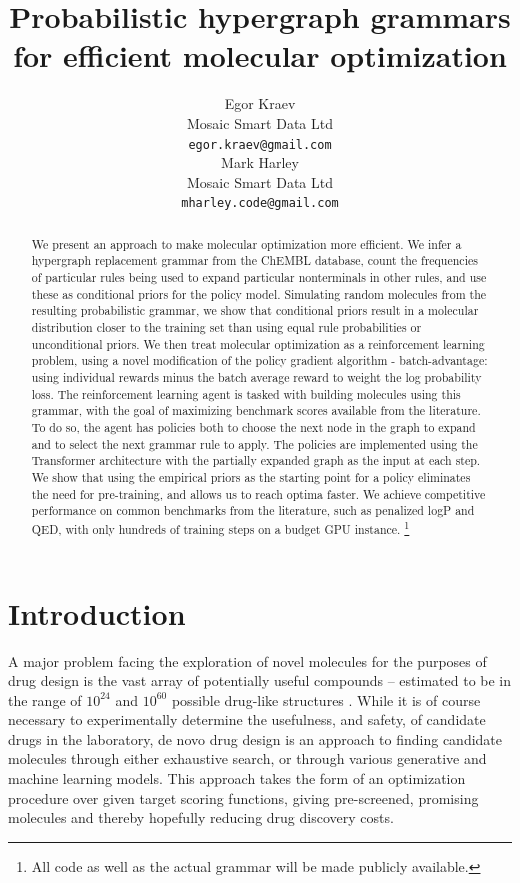 \documentclass{article}
\title{Probabilistic hypergraph grammars for efficient molecular optimization}
\author{%
  Egor Kraev \\
  Mosaic Smart Data Ltd \\
  \texttt{egor.kraev@gmail.com} \\
  \And
  Mark Harley \\
  Mosaic Smart Data Ltd \\
  \texttt{mharley.code@gmail.com}
}
\begin{document}
\maketitle

\begin{abstract}
We present an approach to make molecular optimization more efficient. We infer a hypergraph replacement grammar from the ChEMBL database, count the frequencies of particular rules being used to expand particular nonterminals in other rules, and use these as conditional priors for the policy model. Simulating random molecules from the resulting probabilistic grammar, we show that conditional priors result in a molecular distribution closer to the training set than using equal rule probabilities or unconditional priors. We then treat molecular optimization as a reinforcement learning problem, using a novel modification of the policy gradient algorithm - batch-advantage:  using individual rewards minus the batch average reward to weight the log probability loss. The reinforcement learning agent is tasked with building molecules using this grammar, with the goal of maximizing benchmark scores available from the literature. To do so, the agent has policies both to choose the next node in the graph to expand and to select the next grammar rule to apply. The policies are implemented using the Transformer architecture with the partially expanded graph as the input at each step. We show that using the empirical priors as the starting point for a policy eliminates the need for pre-training, and allows us to reach optima faster. We achieve competitive performance on common benchmarks from the literature, such as penalized logP and QED, with only hundreds of training steps on a budget GPU instance. \footnote{All code as well as the actual grammar will be made publicly available.}
\end{abstract}

\section{Introduction}\label{sec:intro}
A major problem facing the exploration of novel molecules for the purposes of drug design is the vast array of potentially useful compounds -- estimated to be in the range of $10^{24}$ and $10^{60}$ possible drug-like structures \cite{walters2019, ruddigkeit2012}. While it is of course necessary to experimentally determine the usefulness, and safety, of candidate drugs in the laboratory, de novo drug design is an approach to finding candidate molecules through either exhaustive search, or through various generative and machine learning models. This approach takes the form of an optimization procedure over given target scoring functions, giving pre-screened, promising molecules and thereby hopefully reducing drug discovery costs.
\end{document}
